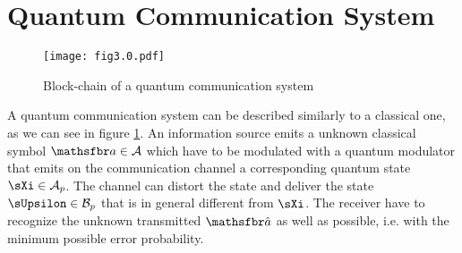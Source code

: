 \section{Quantum Communication System}
    \begin{figure}[t]
        \begin{center}
            \texttt{[image: fig3.0.pdf]}
            \caption{Block-chain of a quantum communication system}
            \label{fig:3.0}
        \end{center}
    \end{figure}
    A quantum communication system can be described similarly to a classical one, as we can 
    see in figure \ref{fig:3.0}. An information source emits a unknown classical symbol 
    $\msf{a} \in \mathcal{A}$ which have to be 
    modulated with a quantum modulator that emits on the communication channel a corresponding quantum
    state $\Operator{\sXi} \in \mathcal{A}_p$. The channel can distort
    the state and deliver the state $\Operator{\sUpsilon} \in \mathcal{B}_p$ that is in general 
    different from $\Operator{\sXi}$.
    The receiver have to recognize the unknown transmitted $\msf{\hat{a}}$ as well as possible, i.e. with 
    the minimum possible error probability.
